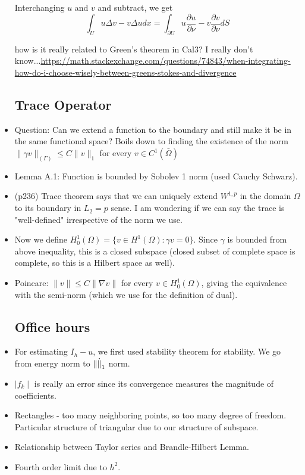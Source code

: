 \documentclass{article}
\theoremstyle{remark}
\begin{document}
\begin{itemize}
Interchanging $u$ and $v$ and subtract, we get $$\int_U u\Delta v-v\Delta u dx=\int_{\partial U}u\frac{\partial u}{\partial \nu}-v\frac{\partial v}{\partial \nu}dS$$

how is it really related to Green's theorem in Cal3? I really don't know...\url{https://math.stackexchange.com/questions/74843/when-integrating-how-do-i-choose-wisely-between-greens-stokes-and-divergence}
\subsection*{Trace Operator}
\item Question: Can we extend a function to the boundary and still make it be in the same functional space? Boils down to finding the existence of the norm $\lVert\gamma v\rVert_{(\Gamma)}\leq C\lVert v\rVert_1$ for every $v\in C^1 (\bar\Omega)$
\item Lemma A.1: Function is bounded by Sobolev 1 norm (used Cauchy Schwarz).
\item (p236) Trace theorem says that we can uniquely extend $W^{1,p}$ in the domain $\Omega$ to its boundary in $L_2=p$ sense. I am wondering if we can say the trace is "well-defined" irrespective of the norm we use.
\item Now we define $H^1_0(\Omega)=\{v\in H^1(\Omega):\gamma v=0\}$. Since $\gamma$ is bounded from above inequality, this is a closed subspace (closed subset of complete space is complete, so this is a Hilbert space as well).
\item Poincare: $\lVert v\rVert\leq C\lVert\nabla v\rVert$ for every $v\in H^1_0(\Omega)$, giving the equivalence with the semi-norm (which we use for the definition of dual).
\subsection*{Office hours}
\item For estimating $I_h-u$, we first used stability theorem for stability. We go from energy norm to $\lVert\dot\rVert_1$ norm. 
\item $\mid f_k\mid$ is really an error since its convergence measures the magnitude of coefficients.
\item Rectangles - too many neighboring points, so too many degree of freedom. Particular structure of triangular due to our structure of subspace.
\item Relationship between Taylor series and Brandle-Hilbert Lemma.
\item Fourth order limit due to $h^2$.


\end{itemize}
\end{document}
